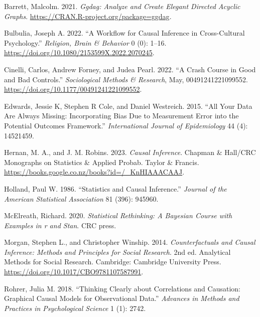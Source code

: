 \documentclass[
  singlecolumn]{report}
\newlength{\cslhangindent}
\newlength{\cslentryspacingunit} %
\newenvironment{CSLReferences}[2] %
 {%
  \setlength{\parindent}{0pt}
  \ifodd #1
  \let\oldpar\par
  \def\par{\hangindent=\cslhangindent\oldpar}
  \fi
  \setlength{\parskip}{#2\cslentryspacingunit}
 }%
 {}
\begin{document}
\hypertarget{refs}{}
\begin{CSLReferences}{1}{0}
\leavevmode{}%
Barrett, Malcolm. 2021. \emph{Ggdag: Analyze and Create Elegant Directed
Acyclic Graphs}. \url{https://CRAN.R-project.org/package=ggdag}.

\leavevmode{}%
Bulbulia, Joseph A. 2022. {``A Workflow for Causal Inference in
Cross-Cultural Psychology.''} \emph{Religion, Brain \& Behavior} 0 (0):
1--16. \url{https://doi.org/10.1080/2153599X.2022.2070245}.

\leavevmode{}%
Cinelli, Carlos, Andrew Forney, and Judea Pearl. 2022. {``A Crash Course
in Good and Bad Controls.''} \emph{Sociological Methods \& Research},
May, 00491241221099552. \url{https://doi.org/10.1177/00491241221099552}.

\leavevmode{}%
Edwards, Jessie K, Stephen R Cole, and Daniel Westreich. 2015. {``All
Your Data Are Always Missing: Incorporating Bias Due to Measurement
Error into the Potential Outcomes Framework.''} \emph{International
Journal of Epidemiology} 44 (4): 14521459.

\leavevmode{}%
Hernan, M. A., and J. M. Robins. 2023. \emph{Causal Inference}. Chapman
\& Hall/CRC Monographs on Statistics \& Applied Probab. Taylor \&
Francis. \url{https://books.google.co.nz/books?id=/_KnHIAAACAAJ}.

\leavevmode{}%
Holland, Paul W. 1986. {``Statistics and Causal Inference.''}
\emph{Journal of the American Statistical Association} 81 (396): 945960.

\leavevmode{}%
McElreath, Richard. 2020. \emph{Statistical Rethinking: A Bayesian
Course with Examples in r and Stan}. CRC press.

\leavevmode{}%
Morgan, Stephen L., and Christopher Winship. 2014. \emph{Counterfactuals
and Causal Inference: Methods and Principles for Social Research}. 2nd
ed. Analytical Methods for Social Research. Cambridge: Cambridge
University Press. \url{https://doi.org/10.1017/CBO9781107587991}.

\leavevmode{}%
Rohrer, Julia M. 2018. {``Thinking Clearly about Correlations and
Causation: Graphical Causal Models for Observational Data.''}
\emph{Advances in Methods and Practices in Psychological Science} 1 (1):
2742.


\end{CSLReferences}
\end{document}
